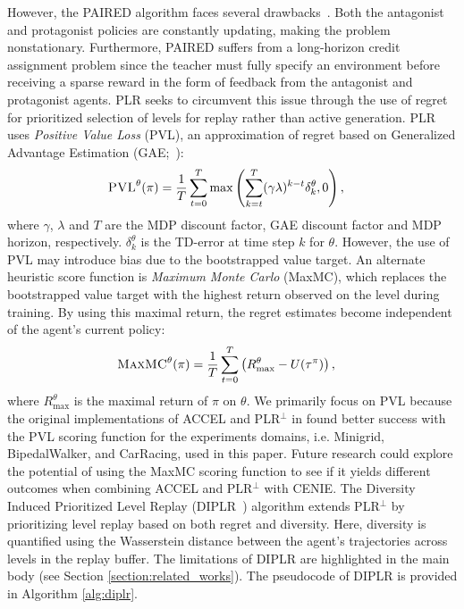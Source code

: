 However, the PAIRED algorithm faces several drawbacks~\cite{mediratta2023stabilizing}. Both the antagonist and protagonist policies are constantly updating, making the problem nonstationary. Furthermore, PAIRED suffers from a long-horizon credit assignment problem since the teacher must fully specify an environment before receiving a sparse reward in the form of feedback from the antagonist and protagonist agents. PLR seeks to circumvent this issue through the use of regret for prioritized selection of levels for replay rather than active generation. PLR uses {\em Positive Value Loss} (PVL), an approximation of regret based on Generalized Advantage Estimation (GAE;~\cite{schulman2015high}):
\begin{align*}
\normalfont\textsc{PVL}^\theta(\pi) &= \frac{1}{T} \sum_{t=0}^{T} \max \left( \sum_{k=t}^{T} (\gamma \lambda)^{k-t} \delta^{\theta}_k, 0 \right),
\end{align*}
where $\gamma$, $\lambda$ and $T$ are the MDP discount factor, GAE discount factor and MDP horizon, respectively. $\delta^{\theta}_k$ is the TD-error at time step $k$ for $\theta$. However, the use of PVL may introduce bias due to the bootstrapped value target. An alternate heuristic score function is {\em Maximum Monte Carlo} (MaxMC), which replaces the bootstrapped value target with the highest return observed on the level during training. By using this maximal return, the regret estimates become independent of the agent’s current policy:
\begin{align*}
\normalfont\textsc{MaxMC}^\theta(\pi) &= \frac{1}{T} \sum_{t=0}^{T} \left( R^{\theta}_{\text{max}} - U(\tau^\pi) \right),
\end{align*}
where $R^{\theta}_{\text{max}}$ is the maximal return of $\pi$ on $\theta$. We primarily focus on PVL because the original implementations of ACCEL and PLR$^\perp$ in \citet{jiang2021replay, parker2022evolving} found better success with the PVL scoring function for the experiments domains, i.e. Minigrid, BipedalWalker, and CarRacing, used in this paper. Future research could explore the potential of using the MaxMC scoring function to see if it yields different outcomes when combining ACCEL and PLR$^\perp$ with CENIE. The Diversity Induced Prioritized Level Replay (DIPLR~\cite{li2023effective}) algorithm extends PLR$^\perp$ by prioritizing level replay based on both regret and diversity. Here, diversity is quantified using the Wasserstein distance between the agent's trajectories across levels in the replay buffer. The limitations of DIPLR are highlighted in the main body (see Section \ref{section:related_works}). The pseudocode of DIPLR is provided in Algorithm \ref{alg:diplr}. 

